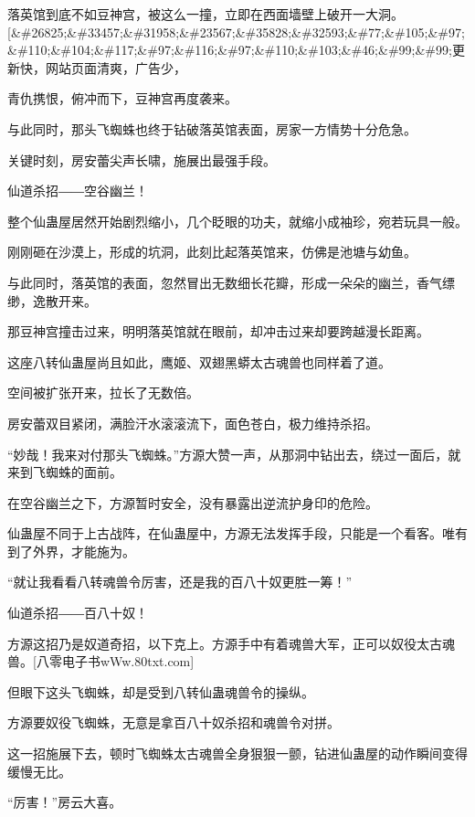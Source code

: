 
\begin{this_body}

落英馆到底不如豆神宫，被这么一撞，立即在西面墙壁上破开一大洞。[\&\#26825;\&\#33457;\&\#31958;\&\#23567;\&\#35828;\&\#32593;\&\#77;\&\#105;\&\#97;\&\#110;\&\#104;\&\#117;\&\#97;\&\#116;\&\#97;\&\#110;\&\#103;\&\#46;\&\#99;\&\#99;更新快，网站页面清爽，广告少，

青仇携恨，俯冲而下，豆神宫再度袭来。

与此同时，那头飞蜘蛛也终于钻破落英馆表面，房家一方情势十分危急。

关键时刻，房安蕾尖声长啸，施展出最强手段。

仙道杀招――空谷幽兰！

整个仙蛊屋居然开始剧烈缩小，几个眨眼的功夫，就缩小成袖珍，宛若玩具一般。

刚刚砸在沙漠上，形成的坑洞，此刻比起落英馆来，仿佛是池塘与幼鱼。

与此同时，落英馆的表面，忽然冒出无数细长花瓣，形成一朵朵的幽兰，香气缥缈，逸散开来。

那豆神宫撞击过来，明明落英馆就在眼前，却冲击过来却要跨越漫长距离。

这座八转仙蛊屋尚且如此，鹰姬、双翅黑蟒太古魂兽也同样着了道。

空间被扩张开来，拉长了无数倍。

房安蕾双目紧闭，满脸汗水滚滚流下，面色苍白，极力维持杀招。

“妙哉！我来对付那头飞蜘蛛。”方源大赞一声，从那洞中钻出去，绕过一面后，就来到飞蜘蛛的面前。

在空谷幽兰之下，方源暂时安全，没有暴露出逆流护身印的危险。

仙蛊屋不同于上古战阵，在仙蛊屋中，方源无法发挥手段，只能是一个看客。唯有到了外界，才能施为。

“就让我看看八转魂兽令厉害，还是我的百八十奴更胜一筹！”

仙道杀招――百八十奴！

方源这招乃是奴道奇招，以下克上。方源手中有着魂兽大军，正可以奴役太古魂兽。[八零电子书wWw.80txt.com]

但眼下这头飞蜘蛛，却是受到八转仙蛊魂兽令的操纵。

方源要奴役飞蜘蛛，无意是拿百八十奴杀招和魂兽令对拼。

这一招施展下去，顿时飞蜘蛛太古魂兽全身狠狠一颤，钻进仙蛊屋的动作瞬间变得缓慢无比。

“厉害！”房云大喜。


\end{this_body}
